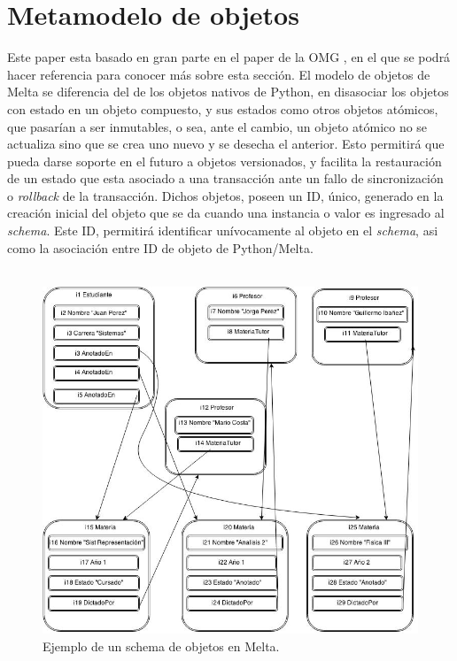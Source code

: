 \documentclass{melta}
\begin{document}
\section{Metamodelo de objetos}
\label{sec:metamodelo}
Este paper esta basado en gran parte en el paper de la OMG \cite{OMG:oodbs}, en el que se podrá hacer referencia para conocer más sobre esta sección. El modelo de objetos de Melta se diferencia del de los objetos nativos de Python, en disasociar los objetos con estado en un objeto compuesto, y sus estados como otros objetos atómicos, que pasarían a ser inmutables, o sea, ante el cambio, un objeto atómico no se actualiza sino que se crea uno nuevo y se desecha el anterior. Esto permitirá que pueda darse soporte en el futuro a objetos versionados, y facilita la restauración de un estado que esta asociado a una transacción ante un fallo de sincronización o \textit{rollback} de la transacción.
Dichos objetos, poseen un ID, único, generado en la creación inicial del objeto que se da cuando una instancia o valor es ingresado al \textit{schema}. Este ID, permitirá identificar unívocamente al objeto en el \textit{schema}, asi como la asociación entre ID de objeto de Python/Melta.
\\\\
\begin{figure}
\centering
\includegraphics[scale=0.35]{modeloobjetos1}
\caption{Ejemplo de un schema de objetos en Melta.}
\label{melta:modeloObjetos}
\end{figure}
\end{document}
